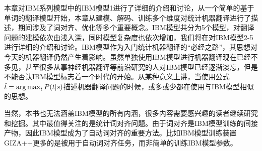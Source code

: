 \parinterval 本章对IBM系列模型中的IBM模型1进行了详细的介绍和讨论，从一个简单的基于单词的翻译模型开始，本章从建模、解码、训练多个维度对统计机器翻译进行了描述，期间涉及了词对齐、优化等多个重要概念。IBM模型共分为5个模型，对翻译问题的建模依次由浅入深，同时模型复杂度也依次增加，我们将在{\chaptersix}对IBM模型2-5进行详细的介绍和讨论。IBM模型作为入门统计机器翻译的“必经之路”，其思想对今天的机器翻译仍然产生着影响。虽然单独使用IBM模型进行机器翻译现在已经不多见，甚至很多从事神经机器翻译等前沿研究的人对IBM模型已经逐渐淡忘，但是不能否认IBM模型标志着一个时代的开始。从某种意义上讲，当使用公式$\hat{{t}} = \operatorname*{arg\,max}_{{t}} {P}({t}|{s})$描述机器翻译问题的时候，或多或少都在使用与IBM模型相似的思想。

\parinterval 当然，本书也无法涵盖IBM模型的所有内涵，很多内容需要感兴趣的读者继续研究和挖掘。其中最值得关注的是统计词对齐问题。由于词对齐是IBM模型训练的间接产物，因此IBM模型成为了自动词对齐的重要方法。比如IBM模型训练装置GIZA++更多的是被用于自动词对齐任务，而非简单的训练IBM模型参数。

